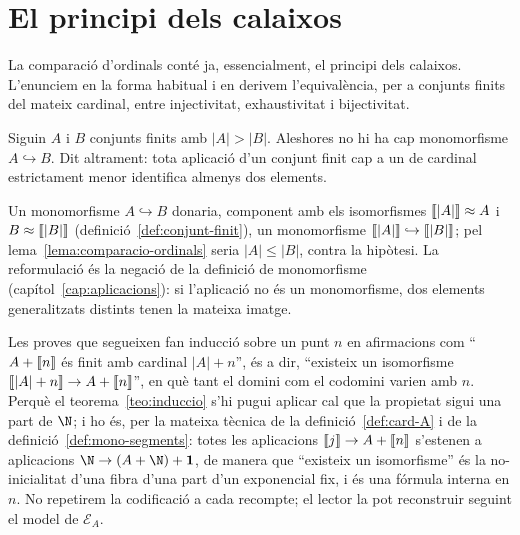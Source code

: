 \section{El principi dels calaixos}\label{sec:calaixos}

La comparació d'ordinals conté ja, essencialment, el principi dels
calaixos. L'enunciem en la forma habitual i en derivem l'equivalència, per
a conjunts finits del mateix cardinal, entre injectivitat, exhaustivitat i
bijectivitat.

\begin{teorema}\label{teo:calaixos}
Siguin \(A\) i \(B\) conjunts finits amb \(|A|>|B|\). Aleshores no hi ha
cap monomorfisme \(A\hookrightarrow B\). Dit altrament: tota aplicació
d'un conjunt finit cap a un de cardinal estrictament menor identifica
almenys dos elements.
\end{teorema}

\begin{prova}
Un monomorfisme \(A\hookrightarrow B\) donaria, component amb els
isomorfismes \(\llbracket |A|\rrbracket\approx A\) i \(B\approx\llbracket |B|\rrbracket\)
(definició~\ref{def:conjunt-finit}), un monomorfisme
\(\llbracket |A|\rrbracket\hookrightarrow\llbracket |B|\rrbracket\); pel
lema~\ref{lema:comparacio-ordinals} seria \(|A|\le|B|\), contra la
hipòtesi. La reformulació és la negació de la definició de monomorfisme
(capítol~\ref{cap:aplicacions}): si l'aplicació no és un monomorfisme,
dos elements generalitzats distints tenen la mateixa imatge.
\end{prova}

\begin{observacio}\label{obs:recomptes-interns}
Les proves que segueixen fan inducció sobre un punt \(n\) en afirmacions
com \enquote{\(A+\llbracket n\rrbracket\) és finit amb cardinal \(|A|+n\)}, és a dir,
\enquote{existeix un isomorfisme \(\llbracket |A|+n\rrbracket\to A+\llbracket n\rrbracket\)}, en què
tant el domini com el codomini varien amb \(n\). Perquè el
teorema~\ref{teo:induccio} s'hi pugui aplicar cal que la propietat sigui
una part de \(\N\); i ho és, per la mateixa tècnica de la
definició~\ref{def:card-A} i de la definició~\ref{def:mono-segments}:
totes les aplicacions \(\llbracket j\rrbracket\to A+\llbracket n\rrbracket\) s'estenen a aplicacions
\(\N\to(A+\N)+\mathbf1\), de manera que \enquote{existeix un isomorfisme}
és la no-inicialitat d'una fibra d'una part d'un exponencial fix, i és
una fórmula interna en \(n\). No repetirem la codificació a cada
recompte; el lector la pot reconstruir seguint el model de
\(\mathcal E_A\).
\end{observacio}


